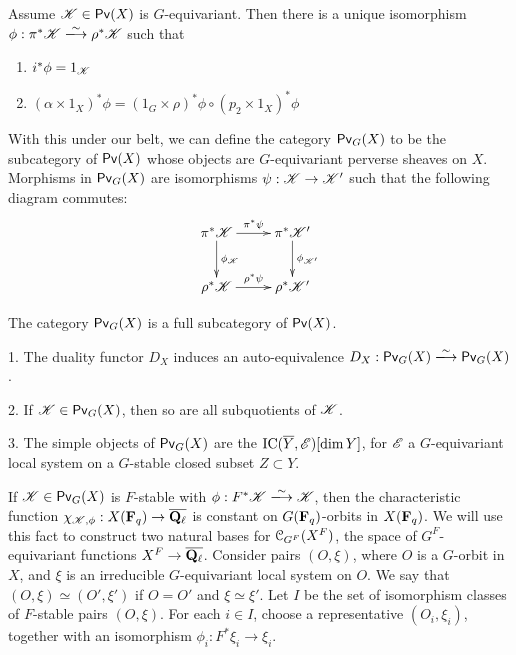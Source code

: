 \documentclass{article}
\begin{document}
\begin{lemma}
Assume $\mathscr{K}\in \operatorname{\mathsf{Pv}}(X)$ is $G$-equivariant. Then there is a unique 
isomorphism $\phi:\pi^\ast \sK \isomorphism \rho^\ast \sK$ such that 
\begin{enumerate}
  \item $i^\ast \phi = 1_{\mathscr{K}}$ 
  \item $(\alpha\times 1_X)^\ast \phi = (1_G\times \rho)^\ast \phi \circ (p_2\times 1_X)^\ast \phi$
\end{enumerate}
\end{lemma}

With this under our belt, we can define the category $\operatorname{\mathsf{Pv}}_G(X)$ to 
be the subcategory of $\operatorname{\mathsf{Pv}}(X)$ whose objects are $G$-equivariant 
perverse sheaves on $X$. Morphisms in $\operatorname{\mathsf{Pv}}_G(X)$ are isomorphisms 
$\psi:\mathscr{K}\to \mathscr{K}'$ such that the following diagram commutes:
\[\xymatrix{
  \pi^\ast \sK \ar[r]^-{\pi^\ast \psi} \ar[d]^-{\phi_\sK} 
    & \pi^\ast \sK' \ar[d]^-{\phi_{\sK'}} \\
  \rho^\ast \sK \ar[r]^-{\rho^\ast \psi} 
    & \rho^\ast \sK' 
}\]

\begin{lemma}
The category $\operatorname{\mathsf{Pv}}_G(X)$ is a full subcategory of $\operatorname{\mathsf{Pv}}(X)$. 
\end{lemma}

\begin{proposition}
1. The duality functor $D_X$ induces an auto-equivalence 
$D_X:\perverse_G(X)\isomorphism \perverse_G(X)$. 

2. If $\mathscr{K}\in \operatorname{\mathsf{Pv}}_G(X)$, then so are all subquotients of $\mathscr{K}$. 

3. The simple objects of $\operatorname{\mathsf{Pv}}_G(X)$ are the 
$\operatorname{IC}(\overline Y,\mathscr{E})[\dim Y]$, for $\mathscr{E}$ a $G$-equivariant 
local system on a $G$-stable closed subset $Z\subset Y$. 
\end{proposition}

If $\mathscr{K}\in \operatorname{\mathsf{Pv}}_G(X)$ is $F$-stable with $\phi:F^\ast \sK\isomorphism \sK$, 
then the characteristic function $\chi_{\mathscr{K},\phi}:X(\mathbf{F}_q) \to \overline{\mathbf{Q}_\ell}$ 
is constant on $G(\mathbf{F}_q)$-orbits in $X(\mathbf{F}_q)$. We will use this fact to construct 
two natural bases for $\mathcal{C}_{G^F}(X^F)$, the space of $G^F$-equivariant functions 
$X^F \to \overline{\mathbf{Q}_\ell}$. Consider pairs 
$(O,\xi)$, where $O$ is a $G$-orbit in $X$, and $\xi$ is an irreducible $G$-equivariant 
local system on $O$. We say that $(O,\xi)\simeq (O',\xi')$ if 
$O=O'$ and $\xi\simeq \xi'$. Let $I$ be the set of isomorphism classes of 
$F$-stable pairs $(O,\xi)$. For each $i\in I$, choose a representative 
$(O_i,\xi_i)$, together with an isomorphism 
$\phi_i:F^\ast \xi_i \to \xi_i$.  
\end{document}
